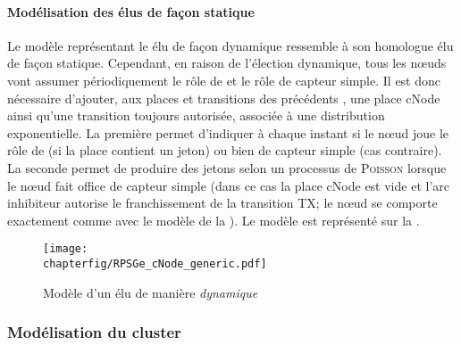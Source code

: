             \paragraph{Modélisation des \cns élus de façon statique}
Le modèle \rpsge représentant le \cn élu de façon dynamique ressemble à son homologue élu de façon statique.
Cependant, en raison de l'élection dynamique, tous les nœuds vont assumer périodiquement le rôle de \cn et le rôle de capteur simple.
Il est donc nécessaire d'ajouter, aux places et transitions des précédents \cns, une place \textsf{cNode} ainsi qu'une transition toujours autorisée, associée à une distribution exponentielle.
La première permet d'indiquer à chaque instant si le nœud joue le rôle de \cn (si la place contient un jeton) ou bien de capteur simple (cas contraire).
La seconde permet de produire des jetons selon un processus de \textsc{Poisson} lorsque le nœud fait office de capteur simple (dans ce cas la place \textsf{cNode} est vide et l'arc inhibiteur autorise le franchissement de la transition \textsf{TX}; le nœud se comporte exactement comme avec le modèle de la ).
Le modèle est représenté sur la .
\begin{figure}[!ht]
    \centering
    \texttt{[image: \\chapterfig/RPSGe\_cNode\_generic.pdf]}
    \caption{Modèle \rpsge d'un \cn élu de manière \emph{dynamique}}\label{sa:fig:cnodegspn2}
\end{figure}

        \subsubsection{Modélisation du cluster}

